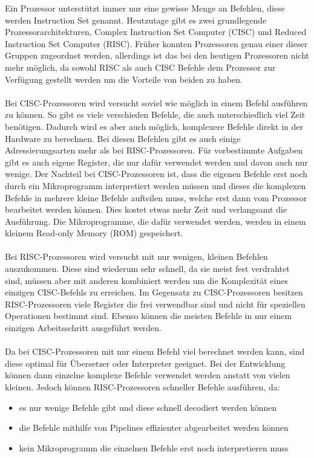 \documentclass[12pt]{article}
\begin{document}
\noindent
Ein Prozessor unterstützt immer nur eine gewisse Menge an Befehlen, diese werden Instruction Set genannt. Heutzutage gibt es zwei grundlegende Prozessorarchitekturen, Complex Instruction Set Computer (CISC) und Reduced Instruction Set Computer (RISC). Früher konnten Prozessoren genau einer dieser Gruppen zugeordnet werden, allerdings ist das bei den heutigen Prozessoren nicht mehr möglich, da sowohl RISC als auch CISC Befehle dem Prozessor zur Verfügung gestellt werden um die Vorteile von beiden zu haben.
\\\\
Bei CISC-Prozessoren wird versucht soviel wie möglich in einem Befehl ausführen zu können. So gibt es viele verschieden Befehle, die auch unterschiedlich viel Zeit benötigen. Dadurch wird es aber auch möglich, komplexere Befehle direkt in der Hardware zu berechnen. Bei diesen Befehlen gibt es auch einige Adressierungsarten mehr als bei RISC-Prozessoren. Für vorbestimmte Aufgaben gibt es auch eigene Register, die nur dafür verwendet werden und davon auch nur wenige. Der Nachteil bei CISC-Prozessoren ist, dass die eigenen Befehle erst noch durch ein Mikroprogramm interpretiert werden müssen und dieses die komplexen Befehle in mehrere kleine Befehle aufteilen muss, welche erst dann vom Prozessor bearbeitet werden können. Dies kostet etwas mehr Zeit und verlangsamt die Ausführung. Die Mikroprogramme, die dafür verwendet werden, werden in einem kleinem Read-only Memory (ROM) gespeichert.
\\\\
Bei RISC-Prozessoren wird versucht mit nur wenigen, kleinen Befehlen auszukommen. Diese sind wiederum sehr schnell, da sie meist fest verdrahtet sind, müssen aber mit anderen kombiniert werden um die Komplexität eines einzigen CISC-Befehls zu erreichen.  Im Gegensatz zu CISC-Prozessoren besitzen RISC-Prozessoren viele Register die frei verwendbar sind und nicht für speziellen Operationen bestimmt sind. Ebenso können die meisten Befehle in nur einem einzigen Arbeitsschritt ausgeführt werden.  \cite{Herold}
\\\\
Da bei CISC-Prozessoren mit nur einem Befehl viel berechnet werden kann, sind diese optimal für Übersetzer oder Interpreter geeignet. Bei der Entwicklung können dann einzelne komplexe Befehle verwendet werden anstatt von vielen kleinen. Jedoch können RISC-Prozessoren schneller Befehle ausführen, da:

\begin{itemize}
\item es nur wenige Befehle gibt und diese schnell decodiert werden können
\item die Befehle mithilfe von Pipelines effizienter abgearbeitet werden können
\item kein Mikroprogramm die einzelnen Befehle erst noch interpretieren muss
\end{itemize}
\end{document}
